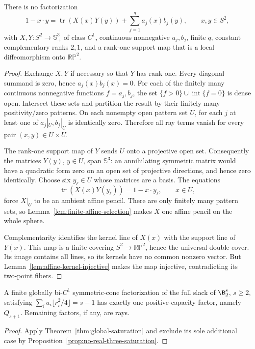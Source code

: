 \begin{proposition}
\label{prop:no-real-three-saturation}
There is no factorization
\[
 1-x\cdot y=\operatorname{tr}(X(x)Y(y))+\sum_{j=1}^q a_j(x)b_j(y),
 \qquad x,y\in S^2,
\]
with $X,Y:S^2\to\mathbb S_+^3$ of class $C^1$, continuous nonnegative
$a_j,b_j$, finite $q$, constant complementary ranks $2,1$, and a
rank-one support map that is a local diffeomorphism onto $\mathbb{RP}^2$.
\end{proposition}
\begin{proof}
Exchange $X,Y$ if necessary so that $Y$ has rank one. Every diagonal
summand is zero, hence $a_j(x)b_j(x)=0$. For each of the finitely many
continuous nonnegative functions $f=a_j,b_j$, the set
$\{f>0\}\cup\operatorname{int}\{f=0\}$ is dense open. Intersect these
sets and partition the result by their finitely many positivity/zero
patterns. On each nonempty open pattern set $U$, for each $j$ at least
one of $a_j|_U,b_j|_U$ is identically zero. Therefore all ray terms vanish
for every pair $(x,y)\in U\times U$.

The rank-one support map of $Y$ sends $U$ onto a projective open set.
Consequently the matrices $Y(y)$, $y\in U$, span $\mathbb S^3$: an
annihilating symmetric matrix would have a quadratic form zero on an open
set of projective directions, and hence zero identically. Choose six
$y_\ell\in U$ whose matrices are a basis. The equations
\[
 \operatorname{tr}(X(x)Y(y_\ell))=1-x\cdot y_\ell,
 \qquad x\in U,
\]
force $X|_U$ to be an ambient affine pencil. There are only finitely many
pattern sets, so Lemma~\ref{lem:finite-affine-selection} makes $X$ one
affine pencil on the whole sphere.

Complementarity identifies the kernel line of $X(x)$ with the support
line of $Y(x)$. This map is a finite covering $S^2\to\mathbb{RP}^2$,
hence the universal double cover. Its image contains all lines, so its
kernels have no common nonzero vector. But
Lemma~\ref{lem:affine-kernel-injective} makes the map injective,
contradicting its two-point fibers.
\end{proof}

\begin{corollary}
\label{cor:ball-global-saturation}
A finite globally bi-$C^1$ symmetric-cone factorization of the full slack
of $\B_2^s$, $s\geq2$, satisfying
$\sum_i a_i\lfloor r_i^2/4\rfloor=s-1$ has exactly one
positive-capacity factor, namely $Q_{s+1}$. Remaining factors, if any,
are rays.
\end{corollary}
\begin{proof}
Apply Theorem~\ref{thm:global-saturation} and exclude its sole additional
case by Proposition~\ref{prop:no-real-three-saturation}.
\end{proof}

